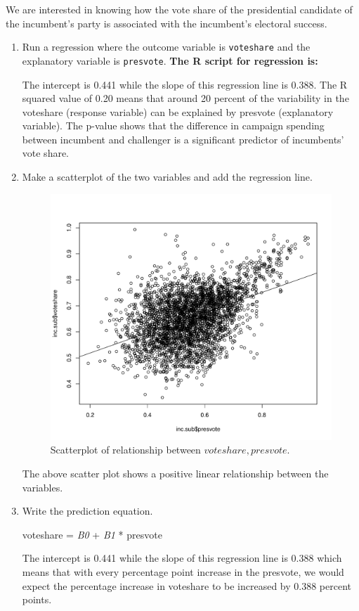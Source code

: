 \documentclass[12pt,letterpaper]{article}
\begin{document}
\noindent We are interested in knowing how the vote share of the presidential candidate of the incumbent's party is associated with the incumbent's electoral success.
	\vspace{.25cm}
	\begin{enumerate}
		\item Run a regression where the outcome variable is \texttt{voteshare} and the explanatory variable is \texttt{presvote}.
			\textbf{		The R script for regression is:}
		  
		
		The intercept is 0.441 while the slope of this regression line is 0.388. The R squared value of 0.20 means that around 20 percent of the variability in the voteshare (response variable) can be explained by presvote (explanatory variable). The p-value shows that the difference in campaign spending between incumbent and challenger is a significant predictor of incumbents' vote share.
			
			
		\item Make a scatterplot of the two variables and add the regression line. 
			
			
			 
				\begin{figure}[h!]\centering	\caption{\footnotesize Scatterplot of relationship between $voteshare, presvote$.}	
				
				\includegraphics[width=.65\textwidth]{plot3.pdf}
				
			\end{figure}
			
			
			The above scatter plot shows a positive linear relationship between the variables.
			
			
		\item Write the prediction equation.
		
		voteshare = \textit{B0} + \textit{B1} * presvote
		
		The intercept is 0.441 while the slope of this regression line is 0.388 which means that with every percentage point increase in the presvote, we would expect the percentage increase in voteshare to be increased by 0.388 percent points.
		
		
		
		
	\end{enumerate}
	
\end{document}
